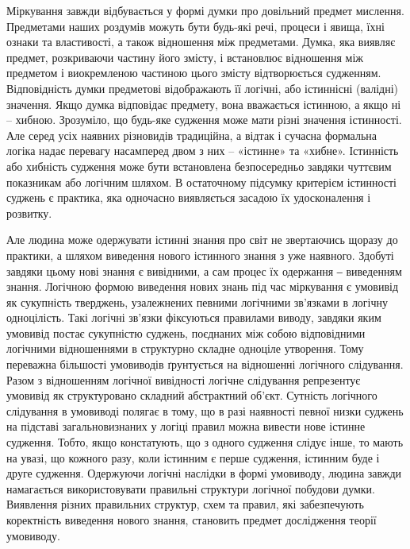 Міркування завжди відбувається у формі думки про довільний предмет
мислення. Предметами наших роздумів можуть бути будь-які речі, процеси і
явища, їхні ознаки та властивості, а також відношення між предметами. Думка,
яка виявляє предмет, розкриваючи частину його змісту, і встановлює
відношення між предметом і виокремленою частиною цього змісту
відтворюється судженням. Відповідність думки предметові відображають її
логічні, або істиннісні (валідні) значення. Якщо думка відповідає предмету,
вона вважається істинною, а якщо ні – хибною. Зрозуміло, що будь-яке
судження може мати різні значення істинності. Але серед усіх наявних
різновидів традиційна, а відтак і сучасна формальна логіка надає перевагу
насамперед двом з них – «істинне» та «хибне». Істинність або хибність
судження може бути встановлена безпосередньо завдяки чуттєвим показникам
або логічним шляхом. В остаточному підсумку критерієм істинності суджень є
практика, яка одночасно виявляється засадою їх удосконалення і розвитку.

Але людина може одержувати істинні знання про світ не звертаючись
щоразу до практики, а шляхом виведення нового істинного знання з уже
наявного. Здобуті завдяки цьому нові знання є вивідними, а сам процес їх
одержання ‒ виведенням знання. Логічною формою виведення нових знань під
час міркування є умовивід як сукупність тверджень, узалежнених певними
логічними зв’язками в логічну одноцілість. Такі логічні зв’язки фіксуються
правилами виводу, завдяки яким умовивід постає сукупністю суджень,
поєднаних між собою відповідними логічними відношеннями в структурно
складне одноціле утворення. Тому переважна більшості умовиводів ґрунтується
на відношенні логічного слідування. Разом з відношенням логічної вивідності
логічне слідування репрезентує умовивід як структуровано складний
абстрактний об’єкт. Сутність логічного слідування в умовиводі полягає в тому,
що в разі наявності певної низки суджень на підставі загальновизнаних у логіці
правил можна вивести нове істинне судження. Тобто, якщо констатують, що з
одного судження слідує інше, то мають на увазі, що кожного разу, коли
істинним є перше судження, істинним буде і друге судження. Одержуючи
логічні наслідки в формі умовиводу, людина завжди намагається
використовувати правильні структури логічної побудови думки. Виявлення
різних правильних структур, схем та правил, які забезпечують коректність
виведення нового знання, становить предмет дослідження теорії умовиводу.

